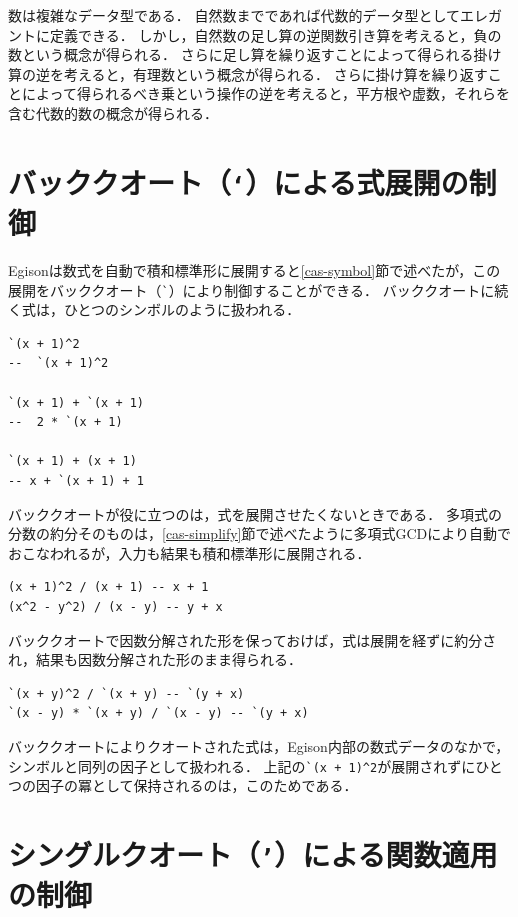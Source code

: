 数は複雑なデータ型である．
自然数までであれば代数的データ型としてエレガントに定義できる．
しかし，自然数の足し算の逆関数引き算を考えると，負の数という概念が得られる．
さらに足し算を繰り返すことによって得られる掛け算の逆を考えると，有理数という概念が得られる．
さらに掛け算を繰り返すことによって得られるべき乗という操作の逆を考えると，平方根や虚数，それらを含む代数的数の概念が得られる．

\section{バッククオート（\texttt{`}）による式展開の制御}\label{mexpr-backquote}

Egisonは数式を自動で積和標準形に展開すると\ref{cas-symbol}節で述べたが，この展開をバッククオート（\lstinline{`}）により制御することができる．
バッククオートに続く式は，ひとつのシンボルのように扱われる．
\begin{lstlisting}[language=egison,numbers=none,escapechar=']
`(x + 1)^2
--  `(x + 1)^2

`(x + 1) + `(x + 1)
--  2 * `(x + 1)

`(x + 1) + (x + 1)
-- x + `(x + 1) + 1
\end{lstlisting}

バッククオートが役に立つのは，式を展開させたくないときである．
多項式の分数の約分そのものは，\ref{cas-simplify}節で述べたように多項式GCDにより自動でおこなわれるが，入力も結果も積和標準形に展開される．
\begin{lstlisting}[language=egison,numbers=none,escapechar=']
(x + 1)^2 / (x + 1) -- x + 1
(x^2 - y^2) / (x - y) -- y + x
\end{lstlisting}
バッククオートで因数分解された形を保っておけば，式は展開を経ずに約分され，結果も因数分解された形のまま得られる．
\begin{lstlisting}[language=egison,numbers=none,escapechar=']
`(x + y)^2 / `(x + y) -- `(y + x)
`(x - y) * `(x + y) / `(x - y) -- `(y + x)
\end{lstlisting}

バッククオートによりクオートされた式は，Egison内部の数式データのなかで，シンボルと同列の因子として扱われる．
上記の\lstinline{`(x + 1)^2}が展開されずにひとつの因子の冪として保持されるのは，このためである．

\section{シングルクオート（\texttt{'}）による関数適用の制御}\label{mexpr-squote}

